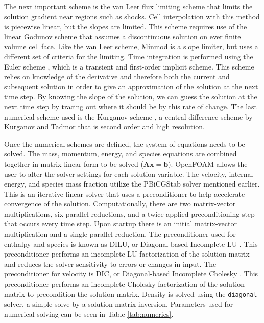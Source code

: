 The next important scheme is the van Leer \cite{vanleer} flux limiting scheme that limits the solution gradient near regions such as shocks. Cell interpolation with this method is piecewise linear, but the slopes are limited. This scheme requires use of the linear Godunov scheme \cite{godunov} that assumes a discontinuous solution on ever finite volume cell face. Like the van Leer scheme, Minmod \cite{minmod} is a slope limiter, but uses a different set of criteria for the limiting. Time integration is performed using the Euler scheme \cite{euler}, which is a transient and first-order implicit scheme. This scheme relies on knowledge of the derivative and therefore both the current and subsequent solution in order to give an approximation of the solution at the next time step. By knowing the slope of the solution, we can guess the solution at the next time step by tracing out where it should be by this rate of change. The last numerical scheme used is the Kurganov scheme \cite{kurganov1}, a central difference scheme by Kurganov and Tadmor that is second order and high resolution. 

Once the numerical schemes are defined, the system of equations needs to be solved. The mass, momentum, energy, and species equations are combined together in matrix linear form to be solved (\(\bm{Ax} = \bm{b}\)). OpenFOAM allows the user to alter the solver settings for each solution variable\cite{ofug}. The velocity, internal energy, and species mass fraction utilize the PBiCGStab solver mentioned earlier. This is an iterative linear solver that uses a preconditioner to help accelerate convergence of the solution.  Computationally, there are two matrix-vector multiplications, six parallel reductions, and a twice-applied preconditioning step that occurs every time step. Upon startup there is an initial matrix-vector multiplication and a single parallel reduction. The preconditioner used for enthalpy and species is known as DILU, or Diagonal-based Incomplete LU \cite{saad}. This preconditioner performs an incomplete LU factorization \cite{schwarzenberg} of the solution matrix and reduces the solver sensitivity to errors or changes in input. The preconditioner for velocity is DIC, or Diagonal-based Incomplete Cholesky \cite{golub}. This preconditioner performs an incomplete Cholesky factorization of the solution matrix to precondition the solution matrix. Density is solved using the \verb|diagonal| solver, a simple solve by a solution matrix inversion. Parameters used for numerical solving can be seen in Table \ref{tab:numerics}.

